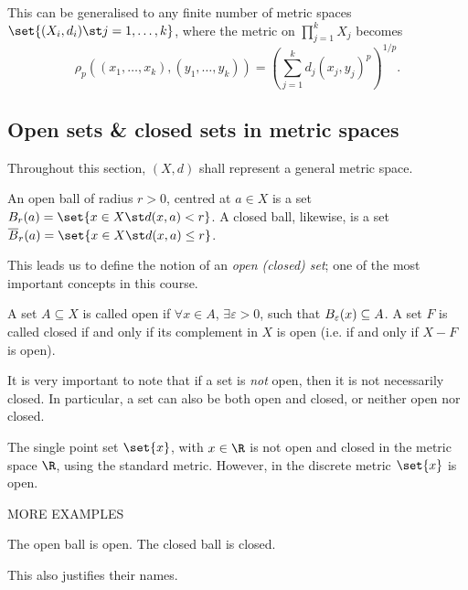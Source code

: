 This can be generalised to any finite number of metric spaces $\set{(X_i, d_i) \st j=1,\dots,k}$, where the metric on $\prod_{j=1}^{k} X_j$ becomes
\begin{equation*}
  \rho_{p}((x_1,\dots,x_k), (y_1,\dots,y_k))
  = \left(\sum_{j=1}^{k} d_{j}(x_j, y_j)^{p}\right)^{1/p}.
\end{equation*}


\subsection{Open sets \& closed sets in metric spaces}
Throughout this section, $(X,d)$ shall represent a general metric space.

\begin{ndfn}
  An open ball of radius $r>0$, centred at $a \in X$ is a set $\oB_{r}(a) = \set{x \in X \st d(x,a) < r}$. A closed ball, likewise, is a set $\cB_{r}(a) = \set{x \in X \st d(x,a) \leq r}$.
\end{ndfn}
This leads us to define the notion of an \emph{open (closed) set}; one of the most important concepts in this course.

\begin{ndfn}
  A set $A \subseteq X$ is called open if $\forall x \in A$, $\exists \varepsilon > 0$, such that $B_{\varepsilon}(x) \subseteq A$. A set $F$ is called closed if and only if its complement in $X$ is open (i.e. if and only if $X-F$ is open).
\end{ndfn}
It is very important to note that if a set is \emph{not} open, then it is not necessarily closed. In particular, a set can also be both open and closed, or neither open nor closed.


\begin{negg}
  The single point set $\set{x}$, with $x\in\R$ is not open and closed in the metric space $\R$, using the standard metric. However, in the discrete metric $\set{x}$ is open.\eggqed
\end{negg}

MORE EXAMPLES

\begin{nlemma}
  The open ball is open. The closed ball is closed.
\end{nlemma}
This also justifies their names.

